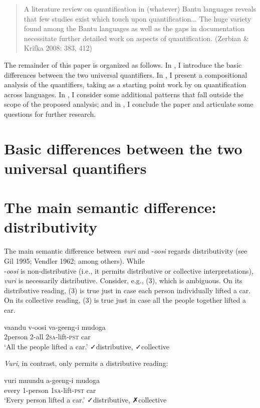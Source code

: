 \documentclass[output=paper]{langsci/langscibook}
\begin{document}
\begin{quote}
A literature review on quantification in (whatever) Bantu languages reveals that few studies exist which touch upon quantification... The huge variety found among the Bantu languages as well as the gaps in documentation necessitate further detailed work on aspects of quantification. (Zerbian \& Krifka 2008: 383, 412) 
\end{quote}

  The remainder of this paper is organized as follows. In , I introduce the basic differences between the two universal quantifiers. In , I present a compositional analysis of the quantifiers, taking as a starting point work by \citet{Matthewson2013} on quantification across languages. In , I consider some additional patterns that fall outside the scope of the proposed analysis; and in , I conclude the paper and articulate some questions for further research.

\section{Basic differences between the two universal quantifiers}

\section{The main semantic difference: distributivity} 

The main semantic difference between \textit{vuri} and -\textit{oosi} regards distributivity (see Gil 1995; Vendler 1962; among others). While \\
{}-\textit{oosi} is non-distributive (i.e., it permits distributive or collective interpretations), \textit{vuri} is necessarily distributive. Consider, e.g., (3), which is ambiguous. On its distributive reading, (3) is true just in case each person individually lifted a car. On its collective reading, (3) is true just in case all the people together lifted a car.

\ea
\gll vaandu  v-oosi    va-geeng-i    mudoga\\
     2person  2-all    2\textsc{sa}{}-lift-\textsc{pst}    car\\
\glt ‘All the people lifted a car.’  ✓distributive, ✓collective
\z

\textit{Vuri}, in contrast, only permits a distributive reading:

\ea
\gll vuri  muundu  a-geeng-i    mudoga\\
     every  1-person  1\textsc{sa}{}-lift-\textsc{pst}    car\\
\glt ‘Every person lifted a car.’  ✓distributive, ✗collective
\z
\end{document}
